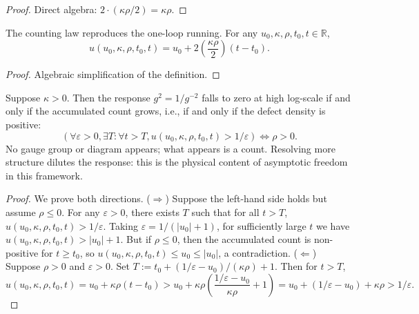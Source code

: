 \begin{proof}
Direct algebra: $2 \cdot (\kappa\rho/2) = \kappa\rho$.
\end{proof}

\begin{theorem}
The counting law reproduces the one-loop running. For any $u_0, \kappa, \rho, t_0, t \in \mathbb{R}$,
\begin{equation}
u(u_0, \kappa, \rho, t_0, t) = u_0 + 2 \left(\frac{\kappa\rho}{2}\right) (t - t_0) .
\end{equation}
\end{theorem}

\begin{proof}
Algebraic simplification of the definition.
\end{proof}

\begin{theorem}
Suppose $\kappa > 0$. Then the response $g^2 = 1/g^{-2}$ falls to zero at high log-scale if and only if the accumulated count grows, i.e., if and only if the defect density is positive:
\begin{equation}
\left(\forall \varepsilon > 0, \exists T : \forall t > T, u(u_0, \kappa, \rho, t_0, t) > 1/\varepsilon\right) \iff \rho > 0 .
\end{equation}
No gauge group or diagram appears; what appears is a count. Resolving more structure dilutes the response: this is the physical content of asymptotic freedom in this framework.
\end{theorem}

\begin{proof}
We prove both directions.
($\Rightarrow$) Suppose the left-hand side holds but assume $\rho \leq 0$. For any $\varepsilon > 0$, there exists $T$ such that for all $t > T$, $u(u_0, \kappa, \rho, t_0, t) > 1/\varepsilon$. Taking $\varepsilon = 1/(|u_0| + 1)$, for sufficiently large $t$ we have $u(u_0, \kappa, \rho, t_0, t) > |u_0| + 1$. But if $\rho \leq 0$, then the accumulated count is non-positive for $t \geq t_0$, so $u(u_0, \kappa, \rho, t_0, t) \leq u_0 \leq |u_0|$, a contradiction.
($\Leftarrow$) Suppose $\rho > 0$ and $\varepsilon > 0$. Set $T := t_0 + (1/\varepsilon - u_0)/(\kappa\rho) + 1$. Then for $t > T$,
\begin{equation}
u(u_0, \kappa, \rho, t_0, t) = u_0 + \kappa\rho(t - t_0) > u_0 + \kappa\rho\left(\frac{1/\varepsilon - u_0}{\kappa\rho} + 1\right) = u_0 + (1/\varepsilon - u_0) + \kappa\rho > 1/\varepsilon .
\end{equation}
\end{proof}

